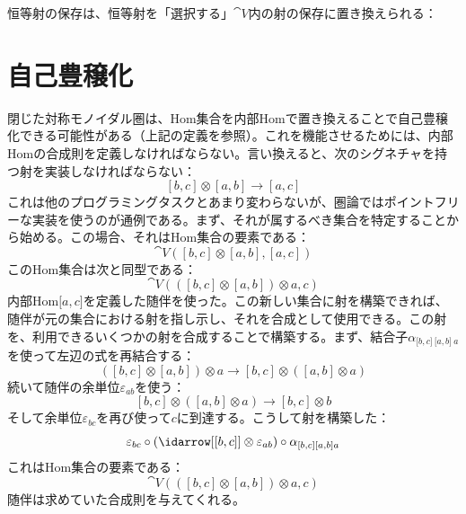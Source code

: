 \begin{figure}[H]
  \centering
\end{figure}

\noindent
恒等射の保存は、恒等射を「選択する」$\cat{V}$内の射の保存に置き換えられる：

\begin{figure}[H]
  \centering
\end{figure}

\section{自己豊穣化}

閉じた対称モノイダル圏は、Hom集合を内部Homで置き換えることで自己豊穣化できる可能性がある（上記の定義を参照）。これを機能させるためには、内部Homの合成則を定義しなければならない。言い換えると、次のシグネチャを持つ射を実装しなければならない：
\[[b, c] \otimes [a, b] \to [a, c]\]
これは他のプログラミングタスクとあまり変わらないが、圏論ではポイントフリーな実装を使うのが通例である。まず、それが属するべき集合を特定することから始める。この場合、それはHom集合の要素である：
\[\cat{V}([b, c] \otimes [a, b], [a, c])\]
このHom集合は次と同型である：
\[\cat{V}(([b, c] \otimes [a, b]) \otimes a, c)\]
内部Hom${[}a, c{]}$を定義した随伴を使った。この新しい集合に射を構築できれば、随伴が元の集合における射を指し示し、それを合成として使用できる。この射を、利用できるいくつかの射を合成することで構築する。まず、結合子$\alpha_{{[}b, c{]}\ {[}a, b{]}\ a}$を使って左辺の式を再結合する：
\[([b, c] \otimes [a, b]) \otimes a \to [b, c] \otimes ([a, b] \otimes a)\]
続いて随伴の余単位$\varepsilon_{a b}$を使う：
\[[b, c] \otimes ([a, b] \otimes a) \to [b, c] \otimes b\]
そして余単位$\varepsilon_{b c}$を再び使って$c$に到達する。こうして射を構築した：
\[\varepsilon_{b c} \circ (\idarrow[{[b, c]}] \otimes \varepsilon_{a b}) \circ \alpha_{[b, c] [a, b] a}\]
これはHom集合の要素である：
\[\cat{V}(([b, c] \otimes [a, b]) \otimes a, c)\]
随伴は求めていた合成則を与えてくれる。

